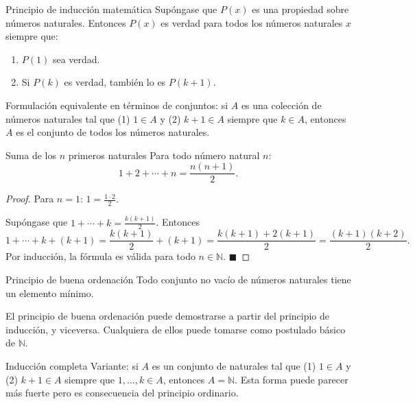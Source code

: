 \documentclass[12pt]{article}
\begin{document}
\begin{axioma}[]{Principio de inducción matemática}
Supóngase que $P(x)$ es una propiedad sobre números naturales. Entonces $P(x)$ es verdad para todos los números naturales $x$ siempre que:
\begin{enumerate}
  \item[(1)] $P(1)$ sea verdad.
  \item[(2)] Si $P(k)$ es verdad, también lo es $P(k+1)$.
\end{enumerate}
\end{axioma}

\begin{nota}[]{}
Formulación equivalente en términos de conjuntos: si $A$ es una colección de números naturales tal que (1) $1 \in A$ y (2) $k+1 \in A$ siempre que $k \in A$, entonces $A$ es el conjunto de todos los números naturales.
\end{nota}

\begin{proposicion}[]{Suma de los $n$ primeros naturales}
Para todo número natural $n$:
\[ 1 + 2 + \cdots + n = \frac{n(n+1)}{2}. \]
\end{proposicion}

\begin{proof}
Para $n = 1$: $1 = \tfrac{1 \cdot 2}{2}$. \checkmark

Supóngase que $1 + \cdots + k = \tfrac{k(k+1)}{2}$. Entonces
\[
  1 + \cdots + k + (k+1) = \frac{k(k+1)}{2} + (k+1) = \frac{k(k+1) + 2(k+1)}{2} = \frac{(k+1)(k+2)}{2}.
\]
Por inducción, la fórmula es válida para todo $n \in \mathbb{N}$.
$\blacksquare$
\end{proof}

\begin{axioma}[]{Principio de buena ordenación}
Todo conjunto no vacío de números naturales tiene un elemento mínimo.
\end{axioma}

\begin{nota}[]{}
El principio de buena ordenación puede demostrarse a partir del principio de inducción, y viceversa. Cualquiera de ellos puede tomarse como postulado básico de $\mathbb{N}$.
\end{nota}

\begin{nota}[]{Inducción completa}
Variante: si $A$ es un conjunto de naturales tal que (1) $1 \in A$ y (2) $k+1 \in A$ siempre que $1, \ldots, k \in A$, entonces $A = \mathbb{N}$. Esta forma puede parecer más fuerte pero es consecuencia del principio ordinario.
\end{nota}
\end{document}
